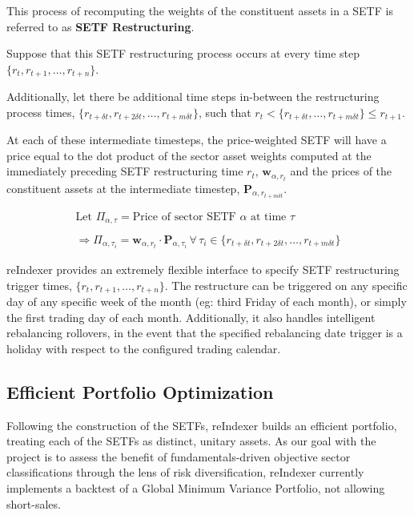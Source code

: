 \documentclass[../main.tex]{subfiles}
\begin{document}
This process of recomputing the weights of the constituent assets in a SETF is referred to as \textbf{SETF Restructuring}.

Suppose that this SETF restructuring process occurs at every time step $\{ r_t, r_{t+1}, \ldots, r_{t+n} \}$.

Additionally, let there be additional time steps in-between the restructuring process times, $\{ r_{t + \delta t}, r_{t + 2\delta t}, \ldots, r_{t + m \delta t} \}$, such that {${r_t < \{ r_{t + \delta t}, \ldots, r_{t + m\delta t} \} \leq r_{t + 1}}$}.

At each of these intermediate timesteps, the price-weighted SETF will have a price equal to the dot product of the sector asset weights computed at the immediately preceding SETF restructuring time $r_{t}$, $\boldsymbol{w}_{\alpha,r_t}$ and the prices of the constituent assets at the intermediate timestep, $\boldsymbol{P}_{\alpha,r_{t+m\delta t}}$.

\begin{gather*}
    \text{Let $\Pi_{\alpha,\tau}$} = \text{Price of sector SETF $\alpha$ at time $\tau$} \\
    \\
    \Rightarrow \Pi_{\alpha,\tau_i} = \boldsymbol{w}_{\alpha, r_t} \cdot \boldsymbol{P}_{\alpha,\tau_i} \, \forall \, \tau_i \in \{ r_{t + \delta t}, r_{t + 2\delta t}, \ldots, r_{t + m \delta t} \}
\end{gather*}

reIndexer provides an extremely flexible interface to specify SETF restructuring trigger times, $\{ r_t, r_{t+1}, \ldots, r_{t+n} \}$. The restructure can be triggered on any specific day of any specific week of the month (eg: third Friday of each month), or simply the first trading day of each month. Additionally, it also handles intelligent rebalancing rollovers, in the event that the specified rebalancing date trigger is a holiday with respect to the configured trading calendar.


\subsection{Efficient Portfolio Optimization} \label{candidate_universe_ranking:port_optim}

Following the construction of the SETFs, reIndexer builds an efficient portfolio, treating each of the SETFs as distinct, unitary assets. As our goal with the project is to assess the benefit of fundamentals-driven objective sector classifications through the lens of risk diversification, reIndexer currently implements a backtest of a Global Minimum Variance Portfolio, not allowing short-sales.
\end{document}
